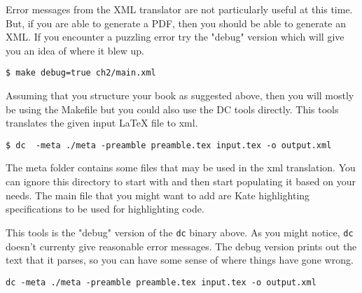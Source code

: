 \begin{gram}
Error messages from the XML translator are not particularly useful at this time.  But, if you are able to generate a PDF, then you should be able to generate an XML. If you encounter a puzzling error try the "debug" version which will give you an idea of where it blew up.   
%
\begin{lstlisting}
$ make debug=true ch2/main.xml
\end{lstlisting}
\end{gram}

\begin{gram}
Assuming that you structure your book as suggested above, then you will mostly be using the Makefile but you could also use the DC tools directly. 
%
This tools translates the given input LaTeX file to xml.

\begin{lstlisting}
$ dc  -meta ./meta -preamble preamble.tex input.tex -o output.xml
\end{lstlisting}

The meta folder contains some files that may be used in the xml translation.  You can ignore this directory to start with and then start populating it based on your needs.  The main file that you might want to add are Kate highlighting specifications to be used for highlighting code.
\end{gram}

\begin{gram}[dc.dbg] 
This tools is the "debug" version of the \lstinline`dc` binary above. As you might notice, \lstinline`dc` doesn't currenty give reasonable error messages.  The debug version prints out the text that it parses, so you can have some sense of where things have gone wrong. 

\begin{lstlisting}
dc -meta ./meta -preamble preamble.tex input.tex -o output.xml
\end{lstlisting}
\end{gram}



